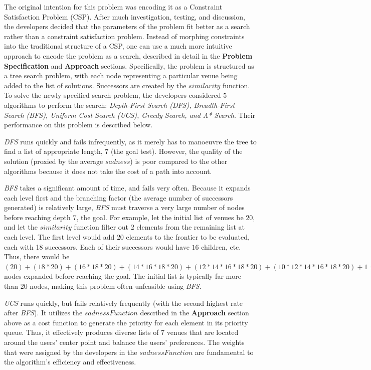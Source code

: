 \documentclass[11pt]{article}
\begin{document}
The original intention for this problem was encoding it as a Constraint Satisfaction Problem (CSP). After much investigation, testing, and discussion, the developers decided that the parameters of the problem fit better as a search rather than a constraint satisfaction problem. Instead of morphing constraints into the traditional structure of a CSP, one can use a much more intuitive approach to encode the problem as a search, described in detail in the \textbf{Problem Specification} and \textbf{Approach} sections. Specifically, the problem is structured as a tree search problem, with each node representing a particular venue being added to the list of solutions. Successors are created by the $similarity$ function. To solve the newly specified search problem, the developers considered $5$ algorithms to perform the search: \textit{Depth-First Search (DFS), Breadth-First Search (BFS), Uniform Cost Search (UCS), Greedy Search, and A* Search}. Their performance on this problem is described below.

\textit{DFS} runs quickly and fails infrequently, as it merely has to manoeuvre the tree to find a list of appropriate length, $7$ (the goal test). However, the quality of the solution (proxied by the average $sadness$) is poor compared to the other algorithms because it does not take the cost of a path into account.

\textit{BFS} takes a significant amount of time, and fails very often. Because it expands each level first and the branching factor (the average number of successors generated) is relatively large, \textit{BFS} must traverse a very large number of nodes before reaching depth $7$, the goal. For example, let the initial list of venues be $20$, and let the $similarity$ function filter out $2$ elements from the remaining list at each level. The first level would add $20$ elements to the frontier to be evaluated, each with 18 successors. Each of their successors would have $16$ children, etc. Thus, there would be $(20)+(18*20)+(16*18*20)+(14*16*18*20)+(12*14*16*18*20)+(10*12*14*16*18*20)+1 = 10,731,261$ nodes expanded before reaching the goal. The initial list is typically far more than $20$ nodes, making this problem often unfeasible using \textit{BFS}.

\textit{UCS} runs quickly, but fails relatively frequently (with the second highest rate after \textit{BFS}). It utilizes the $sadnessFunction$ described in the \textbf{Approach} section above as a cost function to generate the priority for each element in its priority queue. Thus, it effectively produces diverse lists of $7$ venues that are located around the users' center point and balance the users' preferences. The weights that were assigned by the developers in the $sadnessFunction$ are fundamental to the algorithm's efficiency and effectiveness. 
\end{document}
